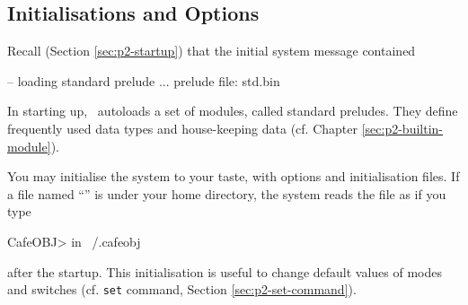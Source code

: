 \documentclass[a4paper]{memoir}
\begin{document}




\subsection{Initialisations and Options}\label{sec:p2-init-opt}

Recall (Section \ref{sec:p2-startup}) that the initial system message
contained
\begin{vvtm}
\begin{ccode}
  -- loading standard prelude 
  ...
     prelude file: std.bin
\end{ccode}
\end{vvtm}
In starting up, \cafeobj~autoloads a set of modules,
called standard preludes. They
define frequently used data types
and house-keeping data (cf. Chapter \ref{sec:p2-builtin-module}).

You may initialise the system to your taste, with options and
initialisation files.
If a file named ``'' is under your
home directory, the system reads the file as if you type
\begin{vvtm}
\begin{ccode}
  CafeOBJ> in ~/.cafeobj
\end{ccode}
\end{vvtm}
after the startup. This initialisation is useful to change default
values of modes and switches (cf. \verb|set| command, Section
\ref{sec:p2-set-command}).
\end{document}
